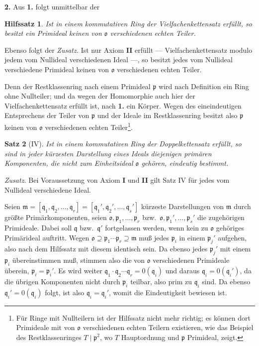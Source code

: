 \documentclass[12pt,a4paper]{article}
\theoremstyle{plain}
\newtheorem{Satz}{Satz}[section]
\newtheorem{Hilfssatz}[Satz]{Hilfssatz}
\theoremstyle{definition}
\theoremstyle{remark}
\begin{document}
\medskip
\noindent
\textbf{2.} Aus \textbf{1.} folgt unmittelbar der

\begin{Hilfssatz}
Ist in einem kommutativen Ring der Vielfachenkettensatz erfüllt, so besitzt ein Primideal keinen von $\mathfrak{o}$ verschiedenen echten Teiler.
\end{Hilfssatz}

Ebenso folgt der \textit{Zusatz.} Ist nur Axiom \textbf{II} erfüllt --- Vielfachenkettensatz modulo jedem vom Nullideal verschiedenen Ideal ---, so besitzt jedes vom Nullideal verschiedene Primideal keinen von $\mathfrak{o}$ verschiedenen echten Teiler.

Denn der Restklassenring nach einem Primideal $\mathfrak{p}$ wird nach Definition ein Ring ohne Nullteiler; und da wegen der Homomorphie auch hier der Vielfachenkettensatz erfüllt ist, nach \textbf{1.} ein Körper. Wegen des eineindeutigen Entsprechens der Teiler von $\mathfrak{p}$ und der Ideale im Restklassenring besitzt also $\mathfrak{p}$ keinen von $\mathfrak{o}$ verschiedenen echten Teiler\footnote{Für Ringe mit Nullteilern ist der Hilfssatz nicht mehr richtig; es können dort Primideale mit von $\mathfrak{o}$ verschiedenen echten Teilern existieren, wie das Beispiel des Restklassenringes $T \mid \mathfrak{p}^{2}$, wo $T$ Hauptordnung und $\mathfrak{p}$ Primideal, zeigt.}.

\begin{Satz}[IV]
Ist in einem kommutativen Ring der Doppelkettensatz erfüllt, so sind in jeder kürzesten Darstellung eines Ideals diejenigen primären Komponenten, die nicht zum Einheitsideal $\mathfrak{o}$ gehören, eindeutig bestimmt.
\end{Satz}

\textit{Zusatz.} Bei Voraussetzung von Axiom \textbf{I} und \textbf{II} gilt Satz IV für jedes vom Nullideal verschiedene Ideal.

Seien $\mathfrak{m} = [\mathfrak{q}_{1}, \mathfrak{q}_{2},\dots, \mathfrak{q}_{r}] = [\mathfrak{q}_{1}', \mathfrak{q}_{2}',\dots, \mathfrak{q}_{s}']$ kürzeste Darstellungen von $\mathfrak{m}$ durch größte Primärkomponenten, seien $\mathfrak{o}, \mathfrak{p}_{1},\dots, \mathfrak{p}_{r}$ bzw.\ $\mathfrak{o}, \mathfrak{p}_{1}',\dots, \mathfrak{p}_{s}'$ die zugehörigen Primideale. Dabei soll $\mathfrak{q}$ bzw.\ $\mathfrak{q}'$ fortgelassen werden, wenn kein zu $\mathfrak{o}$ gehöriges Primärideal auftritt. Wegen $\mathfrak{o} \supseteq \mathfrak{p}_{1} \cdots \mathfrak{p}_{r} \supseteq \mathfrak{m}$ muß jedes $\mathfrak{p}_{i}$ in einem $\mathfrak{p}_{j}'$ aufgehen, also nach dem Hilfssatz mit diesem identisch sein. Da ebenso jedes $\mathfrak{p}_{j}'$ mit einem $\mathfrak{p}_{i}$ übereinstimmen muß, stimmen also die von $\mathfrak{o}$ verschiedenen Primideale überein, $\mathfrak{p}_{i} = \mathfrak{p}_{i}'$. Es wird weiter $\mathfrak{q}_{1} \cdot \mathfrak{q}_{2} \cdots \mathfrak{q}_{r} = 0(\mathfrak{q}_{i})$ und daraus $\mathfrak{q}_{i} = 0(\mathfrak{q}_{i}')$, da die übrigen Komponenten nicht durch $\mathfrak{p}_{i}$ teilbar, also prim zu $\mathfrak{q}_{i}$ sind. Da ebenso $\mathfrak{q}_{i}' = 0(\mathfrak{q}_{i})$ folgt, ist also $\mathfrak{q}_{i} = \mathfrak{q}_{i}'$, womit die Eindeutigkeit bewiesen ist.
\end{document}
